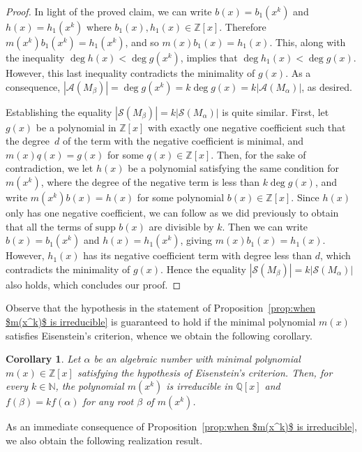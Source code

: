 \documentclass[11pt]{amsart}
\newtheorem{corollary}[theorem]{Corollary}
\theoremstyle{definition}
\theoremstyle{remark}
\numberwithin{equation}{section}
\newcommand{\nn}{\mathbb{N}}
\newcommand{\qq}{\mathbb{Q}}
\newcommand{\zz}{\mathbb{Z}}
\begin{document}
\begin{proof}
    In light of the proved claim, we can write $b(x) = b_1(x^k)$ and $h(x) = h_1(x^k)$ where $b_1(x), h_1(x) \in \mathbb{Z}[x]$. Therefore $m(x^k)b_1(x^k)= h_1(x^k)$, and so $m(x)b_1(x)= h_1(x)$. This, along with the inequality $\deg h(x) < \deg g(x^k)$, implies that $\deg h_1(x) < \deg g(x)$. However, this last inequality contradicts the minimality of $g(x)$. As a consequence, $|\mathcal{A}(M_\beta)| = \deg g(x^k) = k \deg g(x) = k |\mathcal{A}(M_\alpha)|$, as desired.
    \smallskip
   
    Establishing the equality $|\mathcal{S}(M_\beta)| = k |\mathcal{S}(M_\alpha)|$ is quite similar. First, let $g(x)$ be a polynomial in $\mathbb{Z}[x]$ with exactly one negative coefficient such that the degree~$d$ of the term with the negative coefficient is minimal, and $m(x)q(x)=g(x)$ for some $q(x) \in \mathbb{Z}[x]$. Then, for the sake of contradiction, we let $h(x)$ be a polynomial satisfying the same condition for $m(x^k)$, where the degree of the negative term is less than $k\deg g(x)$, and write $m(x^k)b(x) = h(x)$ for some polynomial $b(x) \in \mathbb{Z}[x]$. Since $h(x)$ only has one negative coefficient, we can follow as we did previously to obtain that all the terms of $\text{supp } b(x)$ are divisible by $k$. Then we can write $b(x) = b_1(x^k)$ and $h(x) = h_1(x^k)$, giving $m(x)b_1(x) = h_1(x)$. However, $h_1(x)$ has its negative coefficient term with degree less than $d$, which contradicts the minimality of $g(x)$. Hence the equality $|\mathcal{S}(M_\beta)| = k |\mathcal{S}(M_\alpha)|$ also holds, which concludes our proof.
\end{proof}

Observe that the hypothesis in the statement of Proposition~\ref{prop:when $m(x^k)$ is irreducible} is guaranteed to hold if the minimal polynomial $m(x)$ satisfies Eisenstein's criterion, whence we obtain the following corollary.

\begin{corollary} \label{cor:multiple realizable if eisenstein}
    Let $\alpha$ be an algebraic number with minimal polynomial $m(x) \in \zz[x]$ satisfying the hypothesis of Eisenstein's criterion. Then, for every $k \in \nn$, the polynomial $m(x^k)$ is irreducible in $\qq[x]$ and $f(\beta) = kf(\alpha)$ for any root $\beta$ of $m(x^k)$.
\end{corollary}

As an immediate consequence of Proposition~\ref{prop:when $m(x^k)$ is irreducible}, we also obtain the following realization result.
\end{document}
